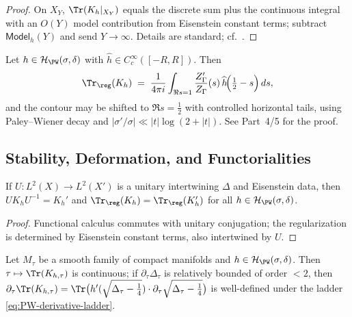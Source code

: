 \begin{proof}
On $X_Y$, $\Tr(K_h|_{X_Y})$ equals the discrete sum plus the continuous integral with an $O(Y)$ model contribution from Eisenstein constant terms; subtract $\mathsf{Model}_h(Y)$ and send $Y\to\infty$. Details are standard; cf.\ \cite[Ch.~3]{HejhalII}. %
\end{proof}

\begin{theorem} \label{thm:contour-interface} %
Let $h\in\mathcal{H}_{\PW}(\sigma,\delta)$ with $\widehat{h}\in C_c^\infty([-R,R])$. Then
\[
  \Tr_{\reg}(K_h)
  \;=\; \frac{1}{4\pi i}\int_{\Re s=1}\frac{Z'_\Gamma}{Z_\Gamma}(s)\,\widehat{h}\!\Big(\tfrac12-s\Big)\,ds,
\]
and the contour may be shifted to $\Re s=\tfrac12$ with controlled horizontal tails, using Paley–Wiener decay and $|\sigma'/\sigma|\ll |t|\log(2+|t|)$. See Part~4/5 for the proof. %
\end{theorem}

\subsection{Stability, Deformation, and Functorialities} \label{subsec:stability-functoriality} \relax \hspace{0pt} %

\begin{proposition} \label{prop:isometric-invariance} %
If $U:L^2(X)\!\to\!L^2(X')$ is a unitary intertwining $\Delta$ and Eisenstein data, then $U K_h U^{-1}=K_h'$ and $\Tr_{\reg}(K_h)=\Tr_{\reg}(K_h')$ for all $h\in\mathcal{H}_{\PW}(\sigma,\delta)$. %
\end{proposition}

\begin{proof}
Functional calculus commutes with unitary conjugation; the regularization is determined by Eisenstein constant terms, also intertwined by $U$. %
\end{proof}

\begin{proposition} \label{prop:deform-compact} %
Let $M_\tau$ be a smooth family of compact manifolds and $h\in\mathcal{H}_{\PW}(\sigma,\delta)$. Then $\tau\mapsto \Tr(K_{h,\tau})$ is continuous; if $\partial_\tau \Delta_\tau$ is relatively bounded of order $<2$, then $\partial_\tau \Tr(K_{h,\tau})=\Tr\big(h'(\sqrt{\Delta_\tau-\tfrac14})\cdot \partial_\tau \sqrt{\Delta_\tau-\tfrac14}\big)$ is well-defined under the ladder \eqref{eq:PW-derivative-ladder}. %
\end{proposition}

